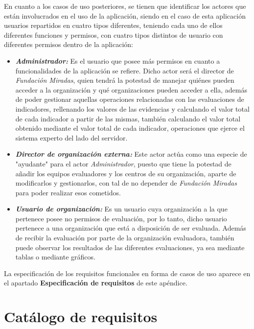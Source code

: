	En cuanto a los casos de uso posteriores, se tienen que identificar los
    actores que están involucrados en el uso de la aplicación, siendo en el caso
    de esta aplicación usuarios repartidos en cuatro tipos diferentes,
    teniendo cada uno de ellos diferentes funciones y permisos, con cuatro tipos
    distintos de usuario con diferentes permisos dentro de la aplicación:%
    \begin{itemize}
        \item \textit{\textbf{Administrador:}} Es el usuario que posee más
        permisos en cuanto a funcionalidades de la aplicación se refiere. Dicho
        actor será el director de \textit{Fundación Miradas}, quien tendrá la
        potestad de manejar quiénes pueden acceder a la organización y qué
        organizaciones pueden acceder a ella, además de poder gestionar aquellas
        operaciones relacionadas con las evaluaciones de indicadores, rellenando
        los valores de las evidencias y calculando el valor total de cada
        indicador a partir de las mismas, también calculando el valor total
        obtenido mediante el valor total de cada indicador, operaciones que
        ejerce el sistema experto del lado del servidor.
        \item \textit{\textbf{Director de organización externa: }}Este actor
        actúa como una especie de "ayudante" para el actor
        \textit{Administrador}, puesto que tiene la potestad de añadir los
        equipos evaluadores y los centros de su organización, aparte de
        modificarlos y gestionarlos, con tal de no depender de \textit{Fundación
        Miradas} para poder realizar esos cometidos. 
        \item \textit{\textbf{Usuario de organización: }}Es un
        usuario cuya organización a la que pertenece posee no permisos de
        evaluación, por lo tanto, dicho usuario pertenece a una organización que
        está a disposición de ser evaluada. Además de recibir la evaluación por
        parte de la organización evaluadora, también puede observar los
        resultados de las diferentes evaluaciones, ya sea mediante tablas o
        mediante gráficos.
    \end{itemize}

	La especificación de los requisitos funcionales en forma de casos de uso
	aparece en el apartado \textbf{Especificación de requisitos} de este apéndice.

\section{Catálogo de requisitos}

